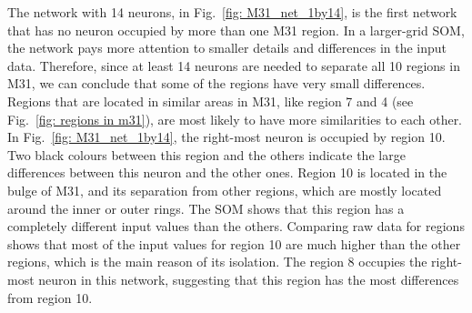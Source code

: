         
        
        The network with 14 neurons, in Fig.~\ref{fig: M31_net_1by14}, is the first network that has no neuron occupied by more than one M31 region.
        In a larger-grid SOM, the network pays more attention to smaller details and differences in the input data.
        Therefore, since at least 14 neurons are needed to separate all 10 regions in M31, we can conclude that some of the regions have very small differences.
        Regions that are located in similar areas in M31, like region 7 and 4 (see Fig.~\ref{fig: regions in m31}), are most likely to have more similarities to each other. %
        In Fig.~\ref{fig: M31_net_1by14}, the right-most neuron is occupied by region 10.
        Two black colours between this region and the others indicate the large differences between this neuron and the other ones.
       Region 10 is located in the bulge of M31, and its separation from other regions, which are mostly located around the inner or outer rings.
       The SOM shows that this region has a completely different input values than the others.
       Comparing raw data for regions shows that most of the input values for region 10 are much higher than the other regions, which is the main reason of its isolation.
        The region 8 occupies the right-most neuron in this network, suggesting that this region has the most differences from region 10.
        
